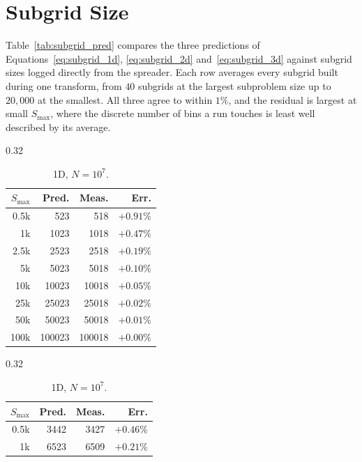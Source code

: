 \section{Subgrid Size}
\label{sec:eval_subgrid}

Table~\ref{tab:subgrid_pred} compares the three predictions of Equations~\eqref{eq:subgrid_1d}, \eqref{eq:subgrid_2d} and~\eqref{eq:subgrid_3d} against subgrid sizes logged directly from the spreader. Each row averages every subgrid built during one transform, from $40$ subgrids at the largest subproblem size up to $20{,}000$ at the smallest. All three agree to within $1\%$, and the residual is largest at small $S_{\max}$, where the discrete number of bins a run touches is least well described by its average.

\begin{table}[ht]
    \centering
    \scriptsize
    \setlength{\tabcolsep}{2.5pt}
    \begin{subtable}[t]{0.32\textwidth}
        \centering
        \begin{tabular}{rrrr}
            \hline
            $S_{\max}$ & Pred. & Meas. & Err. \\
            \hline
            0.5k   & 523    & 518    & $+0.91\%$ \\
            1k     & 1023   & 1018   & $+0.47\%$ \\
            2.5k   & 2523   & 2518   & $+0.19\%$ \\
            5k     & 5023   & 5018   & $+0.10\%$ \\
            10k    & 10023  & 10018  & $+0.05\%$ \\
            25k    & 25023  & 25018  & $+0.02\%$ \\
            50k    & 50023  & 50018  & $+0.01\%$ \\
            100k   & 100023 & 100018 & $+0.00\%$ \\
            \hline
        \end{tabular}
        \caption{1D, $N = 10^7$.}
        \label{tab:subgrid_1d}
    \end{subtable}
    \hfill
    \begin{subtable}[t]{0.32\textwidth}
        \centering
        \begin{tabular}{rrrr}
            \hline
            $S_{\max}$ & Pred. & Meas. & Err. \\
            \hline
            0.5k   & 3442   & 3427   & $+0.46\%$ \\
            1k     & 6523   & 6509   & $+0.21\%$ \\

\end{tabular}
\end{subtable}
\end{table}
